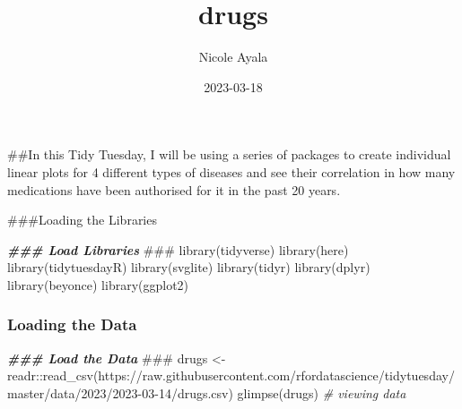 \documentclass[
]{article}
\title{drugs}
\author{Nicole Ayala}
\date{2023-03-18}
\newenvironment{Shaded}{\begin{snugshade}}{\end{snugshade}}
\newcommand{\AlertTok}[1]{\textcolor[rgb]{0.94,0.16,0.16}{#1}}
\newcommand{\CommentTok}[1]{\textcolor[rgb]{0.56,0.35,0.01}{\textit{#1}}}
\newcommand{\DocumentationTok}[1]{\textcolor[rgb]{0.56,0.35,0.01}{\textbf{\textit{#1}}}}
\newcommand{\FunctionTok}[1]{\textcolor[rgb]{0.00,0.00,0.00}{#1}}
\newcommand{\NormalTok}[1]{#1}
\newcommand{\OtherTok}[1]{\textcolor[rgb]{0.56,0.35,0.01}{#1}}
\newcommand{\SpecialCharTok}[1]{\textcolor[rgb]{0.00,0.00,0.00}{#1}}
\newcommand{\StringTok}[1]{\textcolor[rgb]{0.31,0.60,0.02}{#1}}
\begin{document}
\maketitle

\#\#In this Tidy Tuesday, I will be using a series of packages to create
individual linear plots for 4 different types of diseases and see their
correlation in how many medications have been authorised for it in the
past 20 years.

\#\#\#Loading the Libraries

\begin{Shaded}
\begin{Highlighting}[]
\DocumentationTok{\#\#\# Load Libraries }\AlertTok{\#\#\#}
\FunctionTok{library}\NormalTok{(tidyverse)}
\FunctionTok{library}\NormalTok{(here)}
\FunctionTok{library}\NormalTok{(tidytuesdayR)}
\FunctionTok{library}\NormalTok{(svglite)}
\FunctionTok{library}\NormalTok{(tidyr)}
\FunctionTok{library}\NormalTok{(dplyr)}
\FunctionTok{library}\NormalTok{(beyonce)}
\FunctionTok{library}\NormalTok{(ggplot2)}
\end{Highlighting}
\end{Shaded}

\hypertarget{loading-the-data}{%
\subsubsection{Loading the Data}\label{loading-the-data}}

\begin{Shaded}
\begin{Highlighting}[]
\DocumentationTok{\#\#\# Load the Data }\AlertTok{\#\#\#}
\NormalTok{drugs }\OtherTok{\textless{}{-}}\NormalTok{ readr}\SpecialCharTok{::}\FunctionTok{read\_csv}\NormalTok{(}\StringTok{\textquotesingle{}https://raw.githubusercontent.com/rfordatascience/tidytuesday/master/data/2023/2023{-}03{-}14/drugs.csv\textquotesingle{}}\NormalTok{)}
\FunctionTok{glimpse}\NormalTok{(drugs) }\CommentTok{\# viewing data}
\end{Highlighting}
\end{Shaded}
\end{document}
